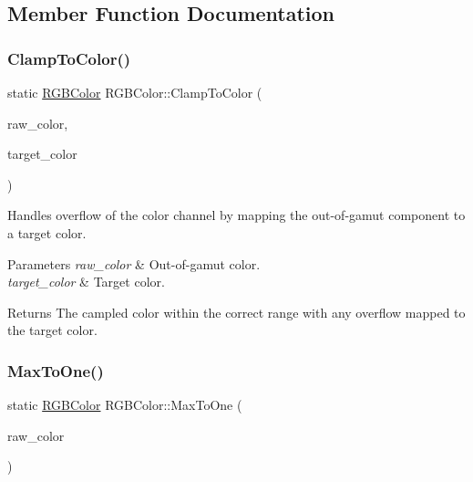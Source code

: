 \subsection{Member Function Documentation}
\hypertarget{class_r_g_b_color_acf9d559b664ee64da542949952bdf0f4}{}\label{class_r_g_b_color_acf9d559b664ee64da542949952bdf0f4} 
\subsubsection{\texorpdfstring{Clamp\+To\+Color()}{ClampToColor()}}
{\footnotesize\ttfamily static \hyperlink{class_r_g_b_color}{R\+G\+B\+Color} R\+G\+B\+Color\+::\+Clamp\+To\+Color (\begin{DoxyParamCaption}\item[{const \hyperlink{class_r_g_b_color}{R\+G\+B\+Color} \&}]{raw\+\_\+color,  }\item[{const \hyperlink{class_r_g_b_color}{R\+G\+B\+Color} \&}]{target\+\_\+color }\end{DoxyParamCaption})\hspace{0.3cm}{\ttfamily [static]}}

Handles overflow of the color channel by mapping the out-\/of-\/gamut component to a target color. 
\begin{DoxyParams}{Parameters}
{\em raw\+\_\+color} & Out-\/of-\/gamut color. \\
\hline
{\em target\+\_\+color} & Target color. \\
\hline
\end{DoxyParams}
\begin{DoxyReturn}{Returns}
The campled color within the correct range with any overflow mapped to the target color. 
\end{DoxyReturn}
\hypertarget{class_r_g_b_color_a767e650d2607d6a9138ab2929af21963}{}\label{class_r_g_b_color_a767e650d2607d6a9138ab2929af21963} 
\subsubsection{\texorpdfstring{Max\+To\+One()}{MaxToOne()}}
{\footnotesize\ttfamily static \hyperlink{class_r_g_b_color}{R\+G\+B\+Color} R\+G\+B\+Color\+::\+Max\+To\+One (\begin{DoxyParamCaption}\item[{const \hyperlink{class_r_g_b_color}{R\+G\+B\+Color} \&}]{raw\+\_\+color }\end{DoxyParamCaption})\hspace{0.3cm}{\ttfamily [static]}}

